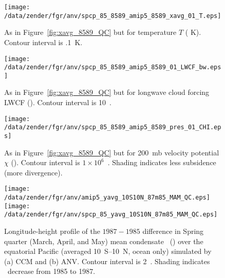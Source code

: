 \documentclass[twocolumn,final]{article}
\begin{document}
\begin{figure}
\begin{center}
\texttt{[image: /data/zender/fgr/anv/spcp\_85\_8589\_amip5\_8589\_xavg\_01\_T.eps]}\vfill
\end{center}
\caption{
As in Figure~\ref{fig:xavg_8589_QC} but for temperature $T$ (\degreee
K).
Contour interval is .1~\degreee K. 
\label{fig:xavg_8589_T}}   
\end{figure}

\setcounter{figure}{8}
\begin{figure}
\begin{center}
\texttt{[image: /data/zender/fgr/anv/spcp\_85\_8589\_amip5\_8589\_01\_LWCF\_bw.eps]}\vfill
\end{center}
\caption{
As in Figure~\ref{fig:xavg_8589_QC} but for longwave cloud forcing
LWCF (\wxmS). 
Contour interval is 10~\wxmS. 
\label{fig:8589_LWCF}}   
\end{figure}

\begin{figure}
\begin{center}
\texttt{[image: /data/zender/fgr/anv/spcp\_85\_8589\_amip5\_8589\_pres\_01\_CHI.eps]}\vfill
\end{center}
\caption{
As in Figure~\ref{fig:xavg_8589_QC} but for 200~mb velocity potential
$\chi$ (\mSxs). 
Contour interval is $1 \times 10^6$~\mSxs.  
Shading indicates less subsidence (more divergence). 
\label{fig:pres_8589_01_CHI}}   
\end{figure}
\clearpage

\setcounter{figure}{12}
\begin{figure}
\begin{center}
\texttt{[image: /data/zender/fgr/anv/amip5\_yavg\_10S10N\_87m85\_MAM\_QC.eps]}\vfill
\texttt{[image: /data/zender/fgr/anv/spcp\_85\_yavg\_10S10N\_87m85\_MAM\_QC.eps]}\vfill
\end{center}
\caption[Longitude-height profile of the $1987-1985$ difference in
Spring quarter (March, April, and May) mean condensate \qc\ over the
equatorial Pacific simulated by CCM and ANV]{
Longitude-height profile of the $1987-1985$ difference in Spring
quarter (March, April, and May) mean condensate \qc\ (\mgxkg) over the
equatorial Pacific (averaged 10~\degreee S--10~\degreee N, 
ocean only) simulated by (a) CCM and (b) ANV.
Contour interval is 2~\mgxkg.
Shading indicates \qc\ decrease from 1985 to 1987.
\label{fig:yavg_10S10N_87m85_MAM_QC}}   
\end{figure}

\nocite{Zek972}


\end{document}
